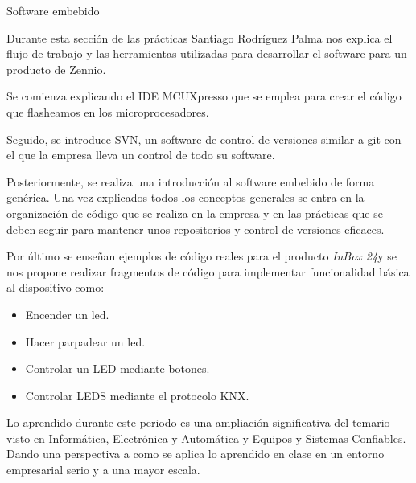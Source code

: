 \ReportSection
{Software embebido}{}
{
    Durante esta sección de las prácticas Santiago Rodríguez Palma nos explica el flujo de trabajo y las herramientas utilizadas para desarrollar el software para un producto de Zennio.
    
    Se comienza explicando el IDE MCUXpresso que se emplea para crear el código que flasheamos en los microprocesadores.
    
    Seguido, se introduce SVN, un software de control de versiones similar a git con el que la empresa lleva un control de todo su software.
    
    Posteriormente, se realiza una introducción al software embebido de forma genérica.
    Una vez explicados todos los conceptos generales se entra en la organización de código que se realiza en la empresa y en las prácticas que se deben seguir para mantener unos repositorios y control de versiones eficaces.
    
    Por último se enseñan ejemplos de código reales para el producto \emph{InBox 24}y se nos propone realizar fragmentos de código para implementar funcionalidad básica al dispositivo como:
    \begin{itemize}
        \item Encender un led.
        \item Hacer parpadear un led.
        \item Controlar un LED mediante botones.
        \item Controlar LEDS mediante el protocolo KNX.
    \end{itemize}
}
{
    Lo aprendido durante este periodo es una ampliación significativa del temario visto en Informática, Electrónica y Automática y Equipos y Sistemas Confiables. Dando una perspectiva a como se aplica lo aprendido en clase en un entorno empresarial serio y a una mayor escala.
}

